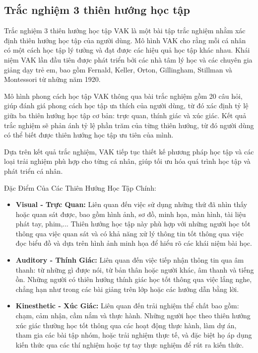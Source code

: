 \subsection{Trắc nghiệm 3 thiên hướng học tập}

Trắc nghiệm 3 thiên hướng học tập VAK là một bài tập trắc nghiệm nhằm xác định thiên hướng học tập của người dùng. Mô hình VAK cho rằng mỗi cá nhân có một cách học tập lý tưởng và đạt được các hiệu quả học tập khác nhau. Khái niệm VAK lần đầu tiên được phát triển bởi các nhà tâm lý học và các chuyên gia giảng dạy trẻ em, bao gồm Fernald, Keller, Orton, Gillingham, Stillman và Montessori từ những năm 1920.

Mô hình phong cách học tập VAK thông qua bài trắc nghiệm gồm 20 câu hỏi, giúp đánh giá phong cách học tập ưa thích của người dùng, từ đó xác định tỷ lệ giữa ba thiên hướng học tập cơ bản: trực quan, thính giác và xúc giác. Kết quả trắc nghiệm sẽ phản ánh tỷ lệ phần trăm của từng thiên hướng, từ đó người dùng có thể biết được thiên hướng học tập ưu tiên của mình.

Dựa trên kết quả trắc nghiệm, VAK tiếp tục thiết kế phương pháp học tập và các loại trải nghiệm phù hợp cho từng cá nhân, giúp tối ưu hóa quá trình học tập và phát triển cá nhân.

Đặc Điểm Của Các Thiên Hướng Học Tập Chính:
\begin{itemize}
    \item \textbf{Visual - Trực Quan:} Liên quan đến việc sử dụng những thứ đã nhìn thấy hoặc quan sát được, bao gồm hình ảnh, sơ đồ, minh họa, màn hình, tài liệu phát tay, phim,... Thiên hướng học tập này phù hợp với những người học tốt thông qua việc quan sát và có khả năng xử lý thông tin tốt thông qua việc đọc biểu đồ và dựa trên hình ảnh minh họa để hiểu rõ các khái niệm bài học.
    \item \textbf{Auditory - Thính Giác:} Liên quan đến việc tiếp nhận thông tin qua âm thanh: từ những gì được nói, từ bản thân hoặc người khác, âm thanh và tiếng ồn. Những người có thiên hướng thính giác học tốt thông qua việc lắng nghe, chẳng hạn như trong các bài giảng trên lớp hoặc các hướng dẫn bằng lời.
    \item \textbf{Kinesthetic - Xúc Giác:} Liên quan đến trải nghiệm thể chất bao gồm: chạm, cảm nhận, cầm nắm và thực hành. Những người học theo thiên hướng xúc giác thường học tốt thông qua các hoạt động thực hành, làm dự án, tham gia các bài tập nhóm, hoặc trải nghiệm thực tế, và đặc biệt họ áp dụng kiến thức qua các thí nghiệm hoặc tự tay thực nghiệm để rút ra kiến thức.
\end{itemize}

